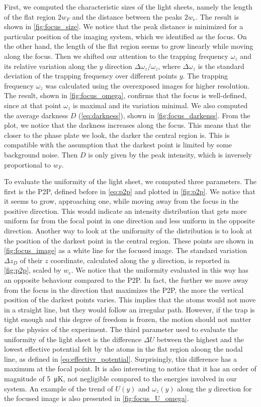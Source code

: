 First, we computed the characteristic sizes of the light sheets, namely the length of the flat region $2w_F$ and the distance between the peaks $2w_e$. The result is shown in \cref{fig:focus_size}. We notice that the peak distance is minimized for a particular position of the imaging system, which we identified as the focus. On the other hand, the length of the flat region seems to grow linearly while moving along the focus. Then we shifted our attention to the trapping frequency $\omega_z$ and its relative variation along the $y$ direction $\Delta \omega_z/\omega_z$, where $\Delta \omega_z$ is the standard deviation of the trapping frequency over different points $y$. The trapping frequency $\omega_z$ was calculated using the overexposed images for higher resolution. The result, shown in \cref{fig:focus_omega}, confirms that the focus is well-defined, since at that point $\omega_z$ is maximal and its variation minimal. We also computed the average darkness $D$ (\cref{eq:darkness}), shown in \cref{fig:focus_darkenss}. From the plot, we notice that the darkness increases along the focus. This means that the closer to the phase plate we look, the darker the central region is. This is compatible with the assumption that the darkest point is limited by some background noise. Then $D$ is only given by the peak intensity, which is inversely proportional to $w_F$.

To evaluate the uniformity of the light sheet, we computed three parameters. The first is the P2P, defined before in \cref{eq:p2p} and plotted in \cref{fig:p2p}. We notice that it seems to grow, approaching one, while moving away from the focus in the positive direction. This would indicate an intensity distribution that gets more uniform far from the focal point in one direction and less uniform in the opposite direction. Another way to look at the uniformity of the distribution is to look at the position of the darkest point in the central region. These points are shown in \cref{fig:focus_image} as a white line for the focused image. The standard variation $\Delta z_D$ of their $z$ coordinate, calculated along the $y$ direction, is reported in \cref{fig:p2p}, scaled by $w_e$. We notice that the uniformity evaluated in this way has an opposite behaviour compared to the P2P. In fact, the further we move away from the focus in the direction that maximizes the P2P, the more the vertical position of the darkest points varies. This implies that the atoms would not move in a straight line, but they would follow an irregular path. However, if the trap is tight enough and this degree of freedom is frozen, the motion should not matter for the physics of the experiment. The third parameter used to evaluate the uniformity of the light sheet is the difference $\Delta U$ between the highest and the lowest effective potential felt by the atoms in the flat region aloong the nodal line, as defined in \cref{eq:effectivr_potential}. Surprisingly, this difference has a maximum at the focal point. It is also interesting to notice that it has an order of magnitude of \SI{5}{\micro K}, not negligible compared to the energies involved in our system. An example of the trend of $U(y)$ and $\omega_z(y)$ along the $y$ direction for the focused image is also presented in \cref{fig:focus_U_omega}.


